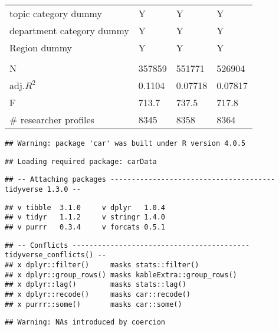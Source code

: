 \documentclass[
]{article}
\begin{document}
\begin{table}
\begin{tabular}[t]{llll}
\hspace{1em}topic category dummy & Y & Y & Y\\
\hspace{1em}department category dummy & Y & Y & Y\\
\hspace{1em}Region dummy & Y & Y & Y\\
\addlinespace[0.3em]
\hline
\multicolumn{4}{l}{\textbf{ }}\\
\hspace{1em}N & 357859 & 551771 & 526904\\
\hspace{1em}adj.$R^2$ & 0.1104 & 0.07718 & 0.07817\\
\hspace{1em}F & 713.7 & 737.5 & 717.8\\
\hspace{1em}\# researcher profiles & 8345 & 8358 & 8364\\
\bottomrule
\end{tabular}
\end{table}

\begin{verbatim}
## Warning: package 'car' was built under R version 4.0.5
\end{verbatim}

\begin{verbatim}
## Loading required package: carData
\end{verbatim}

\begin{verbatim}
## -- Attaching packages --------------------------------------- tidyverse 1.3.0 --
\end{verbatim}

\begin{verbatim}
## v tibble  3.1.0     v dplyr   1.0.4
## v tidyr   1.1.2     v stringr 1.4.0
## v purrr   0.3.4     v forcats 0.5.1
\end{verbatim}

\begin{verbatim}
## -- Conflicts ------------------------------------------ tidyverse_conflicts() --
## x dplyr::filter()     masks stats::filter()
## x dplyr::group_rows() masks kableExtra::group_rows()
## x dplyr::lag()        masks stats::lag()
## x dplyr::recode()     masks car::recode()
## x purrr::some()       masks car::some()
\end{verbatim}

\begin{verbatim}
## Warning: NAs introduced by coercion
\end{verbatim}
\end{document}
